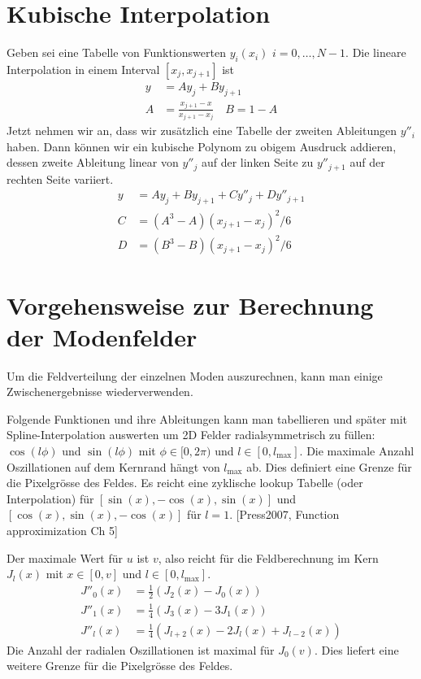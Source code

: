 \documentclass[DIV19,twocolumn]{scrartcl}
\def\({\left(}
\def\){\right)}
\newcommand{\lmax}{l_\textrm{max}}
\begin{document}
\section{Kubische Interpolation}
Geben sei eine Tabelle von Funktionswerten $y_i(x_i)$
$i=0,\ldots,N-1$. Die lineare Interpolation in einem Interval
$[x_j,x_{j+1}]$ ist
\begin{align}
  y &= Ay_j + By_{j+1} \\
  A &= \frac{x_{j+1}-x}{x_{j+1}-x_j}\quad B=1-A
\end{align}
Jetzt nehmen wir an, dass wir zus\"atzlich eine Tabelle der zweiten
Ableitungen $y''_i$ haben. Dann k\"onnen wir ein kubische Polynom zu
obigem Ausdruck addieren, dessen zweite Ableitung linear von $y''_j$
auf der linken Seite zu $y''_{j+1}$ auf der rechten Seite variiert.
\begin{align}
  y &= Ay_j + By_{j+1} + Cy''_j + Dy''_{j+1} \\
  C &= (A^3-A)(x_{j+1}-x_j)^2/6 \\
  D &= (B^3-B)(x_{j+1}-x_j)^2/6 
\end{align}


\section{Vorgehensweise zur Berechnung der Modenfelder}
Um die Feldverteilung der einzelnen Moden auszurechnen, kann man
einige Zwischenergebnisse wiederverwenden.

Folgende Funktionen und ihre Ableitungen kann man tabellieren und
sp\"ater mit Spline-Interpolation auswerten um 2D Felder
radialsymmetrisch zu f\"ullen: $\cos(l\phi)$ und $\sin(l\phi)$ mit
$\phi\in[0,2\pi)$ und $l\in[0,\lmax]$. Die maximale Anzahl
Oszillationen auf dem Kernrand h\"angt von $\lmax$ ab. Dies definiert
eine Grenze f\"ur die Pixelgr\"osse des Feldes. Es reicht eine
zyklische lookup Tabelle (oder Interpolation) f\"ur
$[\sin(x),-\cos(x),\sin(x)]$ und $[\cos(x),\sin(x),-\cos(x)]$ f\"ur $l=1$.
[Press2007, Function approximization Ch 5]


Der maximale Wert f\"ur $u$ ist $v$, also reicht f\"ur die
Feldberechnung im Kern $J_l(x)$ mit
$x\in[0,v]$ und $l\in[0,\lmax]$. 
\begin{align}
  J''_0(x) &= \frac{1}{2}\(J_2(x)-J_0(x)\)\\
  J''_1(x) &= \frac{1}{4}\(J_3(x)-3J_1(x)\)\\
  J''_l(x) &= \frac{1}{4}\(J_{l+2}(x)-2J_l(x)+J_{l-2}(x)\)
\end{align}
Die Anzahl der radialen Oszillationen ist maximal f\"ur $J_0(v)$. Dies
liefert eine weitere Grenze f\"ur die Pixelgr\"osse des Feldes.
\end{document}
